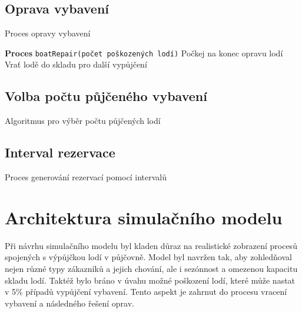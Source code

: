\documentclass[a4paper, 12pt, hidelinks]{article}
\begin{document}
\subsection{Oprava vybavení}

\begin{algorithm}[H]
    \caption{Proces opravy vybavení}\label{alg:repair}
    \SetAlgoLined
    \textbf{Proces} \texttt{boatRepair(počet poškozených lodí)}\;
    Počkej na konec opravu lodí\;
    Vrať lodě do skladu pro další vypůjčení\;
\end{algorithm}

\subsection{Volba počtu půjčeného vybavení}

\begin{algorithm}[H]
\caption{Algoritmus pro výběr počtu půjčených lodí}
\SetAlgoLined
{}
\end{algorithm}

\subsection{Interval rezervace}

\begin{algorithm}[H]
\caption{Proces generování rezervací pomocí intervalů}
\SetAlgoLined
{}
\end{algorithm}

\newpage

\section{Architektura simulačního modelu}
Při návrhu simulačního modelu byl kladen důraz na realistické zobrazení procesů spojených s výpůjčkou lodí v půjčovně. Model byl navržen tak, aby zohledňoval nejen různé typy zákazníků a jejich chování, ale i sezónnost a omezenou kapacitu skladu lodí. Taktéž bylo bráno v úvahu možné poškození lodí, které může nastat v 5\% případů vypůjčení vybavení. Tento aspekt je zahrnut do procesu vracení vybavení a následného řešení oprav.
\end{document}
